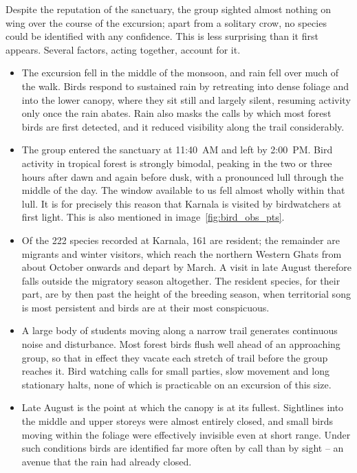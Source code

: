 \documentclass[a4paper, 11pt]{article}
\begin{document}
		Despite the reputation of the sanctuary, the group sighted almost nothing on wing over the course of the excursion; apart from a solitary crow, no species could be identified with any confidence. This is less surprising than it first appears. Several factors, acting together, account for it.%
%		
		\begin{itemize}
			
			\item {} The excursion fell in the middle of the monsoon, and rain fell over much of the walk. Birds respond to sustained rain by retreating into dense foliage and into the lower canopy, where they sit still and largely silent, resuming activity only once the rain abates. Rain also masks the calls by which most forest birds are first detected, and it reduced visibility along the trail considerably.
			
			\item {} The group entered the sanctuary at 11:40~AM and left by 2:00~PM. Bird activity in tropical forest is strongly bimodal, peaking in the two or three hours after dawn and again before dusk, with a pronounced lull through the middle of the day. The window available to us fell almost wholly within that lull. It is for precisely this reason that Karnala is visited by birdwatchers at first light. This is also mentioned in image~\ref{fig:bird_obs_pts}.
			
			\item {} Of the 222 species recorded at Karnala, 161 are resident; the remainder are migrants and winter visitors, which reach the northern Western Ghats from about October onwards and depart by March. A visit in late August therefore falls outside the migratory season altogether. The resident species, for their part, are by then past the height of the breeding season, when territorial song is most persistent and birds are at their most conspicuous.
			
			\item {} A large body of students moving along a narrow trail generates continuous noise and disturbance. Most forest birds flush well ahead of an approaching group, so that in effect they vacate each stretch of trail before the group reaches it. Bird watching calls for small parties, slow movement and long stationary halts, none of which is practicable on an excursion of this size.
			
			\item {} Late August is the point at which the canopy is at its fullest. Sightlines into the middle and upper storeys were almost entirely closed, and small birds moving within the foliage were effectively invisible even at short range. Under such conditions birds are identified far more often by call than by sight -- an avenue that the rain had already closed.
			

\end{itemize}
\end{document}
